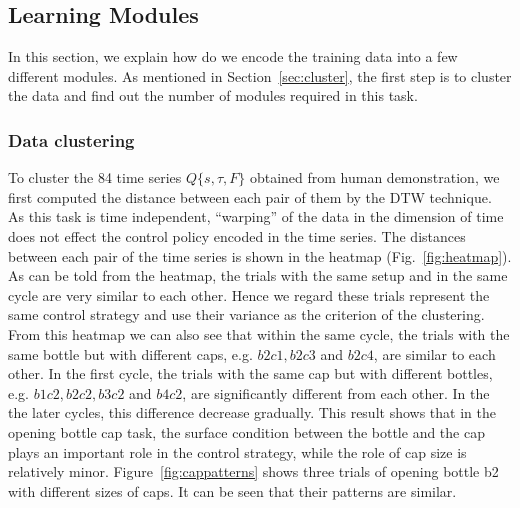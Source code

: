 \subsection{Learning Modules}
\label{learning}

In this section, we explain how do we encode the training data into a few different modules. As mentioned in Section~\ref{sec:cluster}, the first step is to cluster the data and find out the number of modules required in this task.

\subsubsection{Data clustering}
To cluster the 84 time series $Q\{s,\tau,F\}$ obtained from human demonstration, we first computed the distance between each pair of them by the DTW technique. As this task is time independent, ``warping'' of the data in the dimension of time does not effect the control policy encoded in the time series. The distances between each pair of the time series is shown in the heatmap (Fig.~\ref{fig:heatmap}). As can be told from the heatmap, the trials with the same setup and in the same cycle are very similar to each other. Hence we regard these trials represent the same control strategy and use their variance as the criterion of the clustering. From this heatmap we can also see that within the same cycle, the trials with the same bottle but with different caps, e.g. $b2c1, b2c3$ and $b2c4$, are similar to each other. In the first cycle, the trials with the same cap but with different bottles, e.g. $b1c2, b2c2, b3c2$ and $b4c2$, are significantly different from each other. In the the later cycles, this difference decrease gradually. This result shows that in the opening bottle cap task, the surface condition between the bottle and the cap plays an important role in the control strategy, while the role of cap size is relatively minor. Figure~\ref{fig:cappatterns} shows three trials of opening bottle b2 with different sizes of caps. It can be seen that their patterns are similar.

